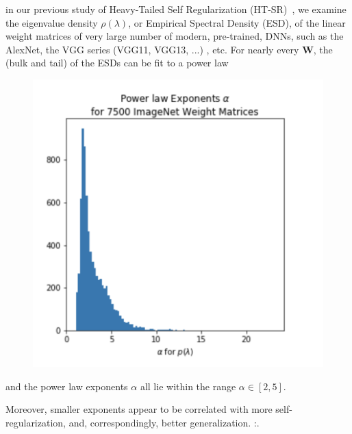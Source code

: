 in our previous study of Heavy-Tailed Self Regularization (HT-SR)~\cite{MM18_TR}, we examine the eigenvalue density
$\rho(\lambda)$, or Empirical Spectral  Density (ESD), of the linear weight matrices of very large number of modern, pre-trained, DNNs,
such as the AlexNet, the VGG series (VGG11, VGG13, ...) ,  etc.  For nearly every $\mathbf{W}$, the (bulk and tail) of the ESDs can be fit to a power law

\begin{figure}[!htb]
   \centering
   \includegraphics[scale=0.40]{img/power-law-histogram.png} 
   \caption{}
   \label{fig:power-law-histogram}
\end{figure}

and the power law exponents $\alpha$ all lie within the range $\alpha\in[2,5]$.


Moreover, smaller exponents appear to be correlated with more self-regularization, and, correspondingly, 
better generalization.
:.

